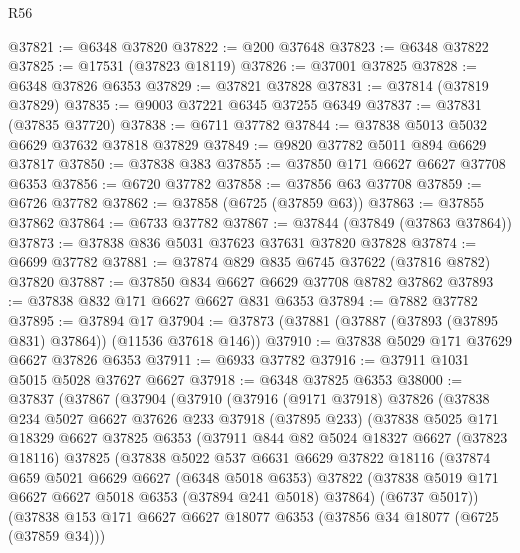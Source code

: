 \begin{lexlean}{R56}
\begin{coremodule}
@37821 := @6348 @37820
@37822 := @200 @37648
@37823 := @6348 @37822
@37825 := @17531 (@37823 @18119)
@37826 := @37001 @37825
@37828 := @6348 @37826 @6353
@37829 := @37821 @37828
@37831 := @37814 (@37819 @37829)
@37835 := @9003 @37221 @6345 @37255 @6349
@37837 := @37831 (@37835 @37720)
@37838 := @6711 @37782
@37844 := @37838 @5013 @5032 @6629 @37632 @37818 @37829
@37849 := @9820 @37782 @5011 @894 @6629 @37817
@37850 := @37838 @383
@37855 := @37850 @171 @6627 @6627 @37708 @6353
@37856 := @6720 @37782
@37858 := @37856 @63 @37708
@37859 := @6726 @37782
@37862 := @37858 (@6725 (@37859 @63))
@37863 := @37855 @37862
@37864 := @6733 @37782
@37867 := @37844 (@37849 (@37863 @37864))
@37873 := @37838 @836 @5031 @37623 @37631 @37820 @37828
@37874 := @6699 @37782
@37881 := @37874 @829 @835 @6745 @37622 (@37816 @8782) @37820
@37887 := @37850 @834 @6627 @6629 @37708 @8782 @37862
@37893 := @37838 @832 @171 @6627 @6627 @831 @6353
@37894 := @7882 @37782
@37895 := @37894 @17
@37904 := @37873 (@37881 (@37887 (@37893 (@37895 @831) @37864)) (@11536 @37618 @146))
@37910 := @37838 @5029 @171 @37629 @6627 @37826 @6353
@37911 := @6933 @37782
@37916 := @37911 @1031 @5015 @5028 @37627 @6627
@37918 := @6348 @37825 @6353
@38000 := @37837
    (@37867
      (@37904
        (@37910
          (@37916
            (@9171 @37918)
            @37826
            (@37838
              @234
              @5027
              @6627
              @37626
              @233
              @37918
              (@37895 @233)
              (@37838
                @5025
                @171
                @18329
                @6627
                @37825
                @6353
                (@37911
                  @844
                  @82
                  @5024
                  @18327
                  @6627
                  (@37823 @18116)
                  @37825
                  (@37838
                    @5022
                    @537
                    @6631
                    @6629
                    @37822
                    @18116
                    (@37874
                      @659
                      @5021
                      @6629
                      @6627
                      (@6348 @5018 @6353)
                      @37822
                      (@37838 @5019 @171 @6627 @6627 @5018 @6353 (@37894 @241 @5018) @37864)
                      (@6737 @5017))
                    (@37838
                      @153
                      @171
                      @6627
                      @6627
                      @18077
                      @6353
                      (@37856 @34 @18077 (@6725 (@37859 @34)))

\end{coremodule}
\end{lexlean}
